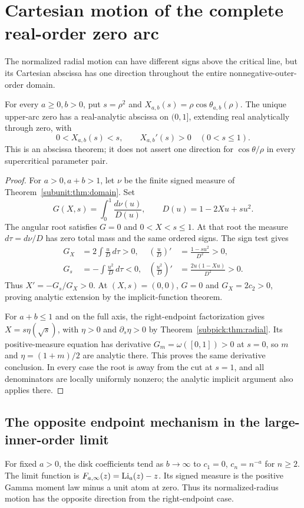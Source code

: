 \section{Cartesian motion of the complete real-order zero arc}
\label{rwcart:sec:motion}
The normalized radial motion can have different signs above the critical
line, but its Cartesian abscissa has one direction throughout the entire
nonnegative-outer-order domain.

\begin{theorem}
\label{rwcart:thm:motion}
For every $a\ge0,b>0$, put $s=\rho^2$ and
$X_{a,b}(s)=\rho\cos\theta_{a,b}(\rho)$. The unique upper-arc zero
has a real-analytic abscissa on $(0,1]$, extending real analytically
through zero, with
\[
 0<X_{a,b}(s)<s,\qquad X_{a,b}'(s)>0\quad(0<s\le1).
\]
This is an abscissa theorem; it does not assert one direction for
$\cos\theta/\rho$ in every supercritical parameter pair.
\end{theorem}
\begin{proof}
For $a>0,a+b>1$, let $\nu$ be the finite signed measure of
Theorem~\ref{subunit:thm:domain}. Set
\[
 G(X,s)=\int_0^1\frac{d\nu(u)}{D(u)},\qquad
 D(u)=1-2Xu+su^2.
\]
The angular root satisfies $G=0$ and $0<X<s\le1$.
At that root the measure $d\tau=d\nu/D$ has zero total mass and
the same ordered signs. The sign test gives
\begin{align*}
 G_X&=2\int\frac uD\,d\tau>0,
 &\left(\frac uD\right)'&=\frac{1-su^2}{D^2}>0,\\
 G_s&=-\int\frac{u^2}D\,d\tau<0,
 &\left(\frac{u^2}D\right)'&=\frac{2u(1-Xu)}{D^2}>0.
\end{align*}
Thus $X'=-G_s/G_X>0$. At $(X,s)=(0,0)$, $G=0$ and
$G_X=2c_2>0$, proving analytic extension by the implicit-function theorem.

For $a+b\le1$ and on the full axis, the right-endpoint factorization
gives $X=s\eta(\sqrt s)$, with $\eta>0$ and
$\partial_s\eta>0$ by Theorem~\ref{subpick:thm:radial}.
Its positive-measure equation has derivative $G_m=\omega([0,1])>0$
at $s=0$, so $m$ and $\eta=(1+m)/2$ are analytic there.
This proves the same derivative conclusion. In every case the root
is away from the cut at $s=1$, and all denominators are locally
uniformly nonzero; the analytic implicit argument also applies there.
\end{proof}

\subsection{The opposite endpoint mechanism in the large-inner-order limit}
For fixed $a>0$, the disk coefficients tend as $b\to\infty$ to
$c_1=0$, $c_n=n^{-a}$ for $n\ge2$. The limit function is
$F_{a,\infty}(z)=\operatorname{Li}_a(z)-z$. Its signed measure is the positive
Gamma moment law minus a unit atom at zero. Thus its normalized-radius
motion has the opposite direction from the right-endpoint case.

